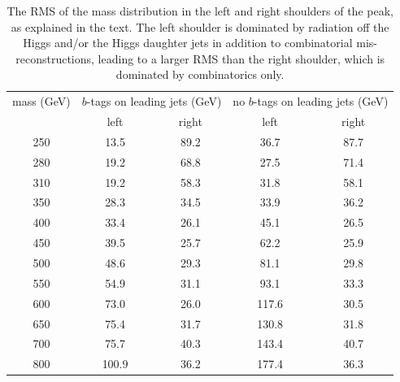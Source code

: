 \begin{table}
\centering
\caption{The RMS of the mass distribution in the left and right shoulders of the peak,
    as explained in the text.  The left shoulder is dominated by radiation off the Higgs
    and/or the Higgs daughter jets in addition to combinatorial mis-reconstructions,
    leading to a larger RMS than the right shoulder, which
    is dominated by combinatorics only.\label{tab:signal_mass_RMS_compare}   }
  \begin{tabular}{ccccc}
     \hline \hline
     mass (GeV) & \multicolumn{2}{c}{$b$-tags on leading jets (GeV)} & \multicolumn{2}{c}{no $b$-tags on leading jets (GeV)}  \\
        & left & right & left & right \\ \hline
     250 & 13.5 & 89.2 & 36.7 & 87.7 \\
     280 & 19.2 & 68.8 & 27.5 & 71.4 \\
     310 & 19.2 & 58.3 & 31.8 & 58.1 \\
     350 & 28.3 & 34.5 & 33.9 & 36.2 \\
     400 & 33.4 & 26.1 & 45.1 & 26.5 \\
     450 & 39.5 & 25.7 & 62.2 & 25.9 \\
     500 & 48.6 & 29.3 & 81.1 & 29.8 \\
     550 & 54.9 & 31.1 & 93.1 & 33.3 \\
     600 & 73.0 & 26.0 & 117.6 & 30.5 \\
     650 & 75.4 & 31.7 & 130.8 & 31.8 \\
     700 & 75.7 & 40.3 & 143.4 & 40.7 \\
     800 & 100.9 & 36.2 & 177.4 & 36.3 \\
     \hline     \end{tabular}
\end{table}






